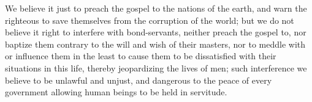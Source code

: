 		We believe it just to preach the gospel to the nations of the earth, and warn the righteous to save themselves from the corruption of the world; but we do not believe it right to interfere with bond-servants, neither preach the gospel to, nor baptize them contrary to the will and wish of their masters, nor to meddle with or influence them in the least to cause them to be dissatisfied with their situations in this life, thereby jeopardizing the lives of men; such interference we believe to be unlawful and unjust, and dangerous to the peace of every government allowing human beings to be held in servitude.

